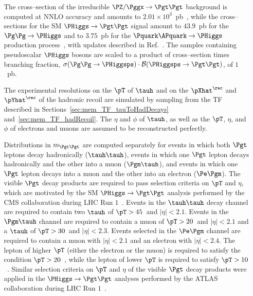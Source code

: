 The cross--section of the irreducible $\PZ/\Pggx \to \Pgt\Pgt$ background is computed at NNLO accuracy and amounts to $2.01 \times 10^{3}$~pb~\cite{FEWZ},
while the cross--sections for the SM $\PHiggs \to \Pgt\Pgt$ signal 
amount to $43.9$~pb for the $\Pg\Pg \to \PHiggs$ and to $3.75$~pb for the $\Pquark\APquark \to \PHiggs$ production process~\cite{Dittmaier:2011ti}, 
with updates described in Ref.~\cite{Heinemeyer:2013tqa}.
The samples containing pseudoscalar $\PHiggs$ bosons are scaled to a product of cross--section times branching fraction, 
$\sigma(\Pg\Pg \to \PHiggsps) \cdot \mathcal{B}(\PHiggsps \to \Pgt\Pgt)$, of $1$~pb.

The experimental resolutions on the $\pT$ of $\tauh$ and on the $\pXhat^{\rec}$ and $\pYhat^{\rec}$ of the hadronic recoil 
are simulated by sampling from the TF described in
Sections~\ref{sec:mem_TF_tauToHadDecays}
and~\ref{sec:mem_TF_hadRecoil}.
The $\eta$ and $\phi$ of $\tauh$,
as well as the $\pT$, $\eta$, and $\phi$ of electrons and muons are assumed to be reconstructed perfectly.

Distributions in $m_{\Pgt\Pgt}$ are computed separately for events in which 
both $\Pgt$ leptons decay hadronically ($\tauh\tauh$), 
events in which one $\Pgt$ lepton decays hadronically and the other into a muon ($\Pgm\tauh$),
and events in which one $\Pgt$ lepton decays into a muon and the other into an electron ($\Pe\Pgm$).
The visible $\Pgt$ decay products are required to pass selection criteria on $\pT$ and $\eta$,
which are motivated by the SM $\PHiggs \to \Pgt\Pgt$ analysis performed by the CMS collaboration during LHC Run $1$~\cite{HIG-13-004}.
Events in the $\tauh\tauh$ decay channel are required to contain
two $\tauh$ of $\pT > 45$~\GeV and $\vert\eta\vert < 2.1$.
Events in the $\Pgm\tauh$ channel
are required to contain a muon of $\pT > 20$~\GeV and $\vert\eta\vert < 2.1$ and a $\tauh$ of $\pT > 30$~\GeV and $\vert\eta\vert < 2.3$.
Events selected in the $\Pe\Pgm$ channel are required to contain a muon with $\vert\eta\vert < 2.1$ and an electron with $\vert\eta\vert < 2.4$.
The lepton of higher $\pT$ (either the electron or the muon) is required to satisfy the condition $\pT > 20$~\GeV,
while the lepton of lower $\pT$ is required to satisfy $\pT > 10$~\GeV.
Similar selection criteria on $\pT$ and $\eta$ of the visible $\Pgt$ decay products were applied in the $\PHiggs \to \Pgt\Pgt$
analyses performed by the ATLAS
collaboration during LHC Run $1$~\cite{ATLAS_HiggsTauTau_SM,ATLAS_HiggsTauTau_MSSM}.

